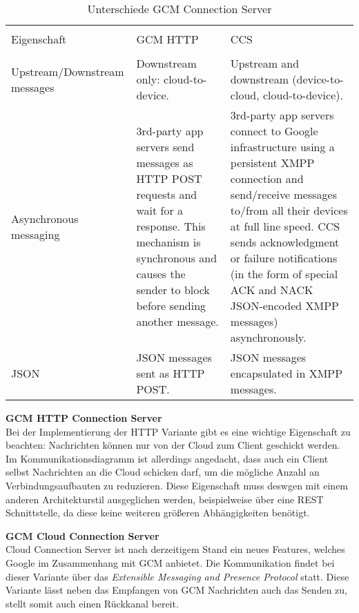 \begin{table}[H]
\caption{Unterschiede GCM Connection Server}

\centering
\begin{tabular}{ p{4cm} p{5cm} p{5cm} }
\\ [-0.5ex]

\hline\hline
\\ [-0.5ex]
Eigenschaft & GCM HTTP & CCS
\\ [1.5ex]
\hline
\\ [-0.5ex]
Upstream/Downstream messages & Downstream only: cloud-to-device. & Upstream and downstream (device-to-cloud, cloud-to-device). \\[1.5ex]
Asynchronous messaging & 3rd-party app servers send messages as HTTP POST requests and wait for a response. This mechanism is synchronous and causes the sender to block before sending another message. & 3rd-party app servers connect to Google infrastructure using a persistent XMPP connection and send/receive messages to/from all their devices at full line speed. CCS sends acknowledgment or failure notifications (in the form of special ACK and NACK JSON-encoded XMPP messages) asynchronously.\\[1.5ex]
JSON & JSON messages sent as HTTP POST. & JSON messages encapsulated in XMPP messages.\\[1.5ex]
\hline
\end{tabular}
\label{tab:unterschiedegcmconnectionserver}
\end{table}


\textbf{GCM HTTP Connection Server}\\
Bei der Implementierung der HTTP Variante gibt es eine wichtige Eigenschaft zu beachten: Nachrichten können nur von der Cloud zum Client geschickt werden. Im Kommunikationsdiagramm ist allerdings angedacht, dass auch ein Client selbst Nachrichten an die Cloud schicken darf, um die mögliche Anzahl an Verbindungsaufbauten zu reduzieren.
Diese Eigenschaft muss deswgen mit einem anderen Architekturstil ausgeglichen werden, beispielweise über eine REST Schnittstelle, da diese keine weiteren größeren Abhängigkeiten benötigt.


\textbf{GCM Cloud Connection Server}\\
Cloud Connection Server ist nach derzeitigem Stand ein neues Features, welches Google im Zusammenhang mit GCM anbietet. Die Kommunikation findet bei dieser Variante über das \textit{Extensible Messaging and Presence Protocol} statt.
Diese Variante lässt neben das Empfangen von GCM Nachrichten auch das Senden zu, stellt somit auch einen Rückkanal bereit.


